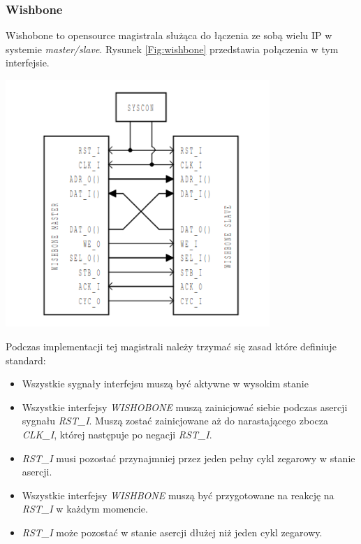 \documentclass[11pt,a4paper]{article}
\begin{document}
		\subsubsection{Wishbone}
		\hspace{5mm}
			Wishobone to opensource magistrala służąca do łączenia ze sobą wielu IP w systemie \textit{master/slave}. Rysunek \ref{Fig:wishbone} przedstawia połączenia w tym interfejsie.\\
			\begin{minipage}{\textwidth}
				\nopagebreak
				\begin{center}
					\includegraphics[width=10cm]{./rysunki/wishbone.png}
				\end{center}
			\end{minipage}
			Podczas implementacji tej magistrali należy trzymać się zasad które definiuje standard:
			\begin{itemize}
				\item Wszystkie sygnały interfejsu muszą być aktywne w wysokim stanie
				\item Wszystkie interfejsy \textit{WISHOBONE} muszą zainicjować siebie podczas asercji sygnału \textit{RST\_I}. Muszą zostać zainicjowane aż do narastającego zbocza \textit{CLK\_I}, której następuje po negacji \textit{RST\_I}.
				\item \textit{RST\_I} musi pozostać przynajmniej przez jeden pełny cykl zegarowy w stanie asercji.
				\item Wszystkie interfejsy \textit{WISHBONE} muszą być przygotowane na reakcję na \textit{RST\_I} w każdym momencie.
				\item \textit{RST\_I} może pozostać w stanie asercji dłużej niż jeden cykl zegarowy.
			\end{itemize}
\end{document}
